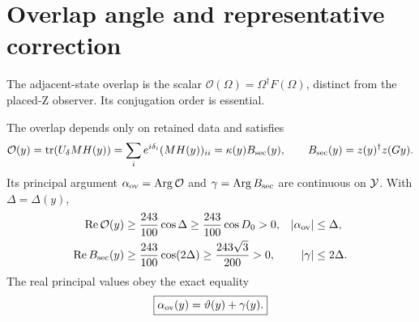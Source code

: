 \section{Overlap angle and representative correction}\label{sec:overlap}

The adjacent-state overlap is the scalar \(\mathcal O(\Omega)=\Omega^\dagger F(\Omega)\), distinct from the placed-Z observer. Its conjugation order is essential.

\begin{theorem}\label{thm:overlap}
The overlap depends only on retained data and satisfies
\begin{equation}
\mathcal O(y)=\operatorname{tr}(U_\delta M H(y))
=\sum_i e^{i\delta_i}(MH(y))_{ii}
=\kappa(y)B_{\rm sec}(y),\qquad B_{\rm sec}(y)=z(y)^\dagger z(Gy).
\label{eq:overlapfactor}
\end{equation}
Its principal argument \(\alpha_{\rm ov}=\operatorname{Arg}\mathcal O\) and \(\gamma=\operatorname{Arg} B_{\rm sec}\) are continuous on \(\mathcal Y\). With \(\Delta=\Delta(y)\),
\begin{align}
\operatorname{Re}\mathcal O(y)&\ge\frac{243}{100}\cos\Delta\ge\frac{243}{100}\cos D_0>0,
&|\alpha_{\rm ov}|&\le\Delta,\label{eq:overlapbound}\\
\operatorname{Re} B_{\rm sec}(y)&\ge\frac{243}{100}\cos(2\Delta)
\ge\frac{243\sqrt3}{200}>0,
&|\gamma|&\le2\Delta.\label{eq:sectionbound}
\end{align}
The real principal values obey the exact equality
\begin{equation}
\boxed{\alpha_{\rm ov}(y)=\vartheta(y)+\gamma(y).}
\label{eq:anglecorrection}
\end{equation}
\end{theorem}
